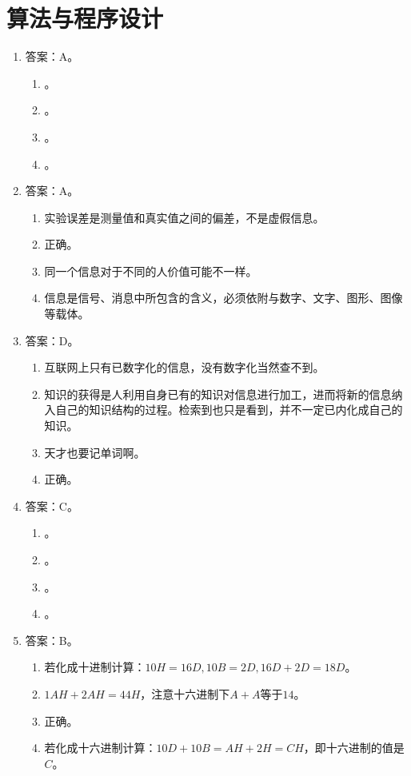 \section{算法与程序设计}

\begin{enumerate}
\item 答案：A。
	\begin{enumerate}[label=\Alph*.]
	\item 。
	\item 。
	\item 。
	\item 。
	\end{enumerate}

\item 答案：A。
	\begin{enumerate}[label=\Alph*.]
	\item 实验误差是测量值和真实值之间的偏差，不是虚假信息。
	\item 正确。
	\item 同一个信息对于不同的人价值可能不一样。
	\item 信息是信号、消息中所包含的含义，必须依附与数字、文字、图形、图像等载体。
	\end{enumerate}

\item 答案：D。
	\begin{enumerate}[label=\Alph*.]
	\item 互联网上只有已数字化的信息，没有数字化当然查不到。
	\item 知识的获得是人利用自身已有的知识对信息进行加工，进而将新的信息纳入自己的知识结构的过程。检索到也只是看到，并不一定已内化成自己的知识。
	\item 天才也要记单词啊。
	\item 正确。
	\end{enumerate}

\item 答案：C。
	\begin{enumerate}[label=\Alph*.]
	\item 。
	\item 。
	\item 。
	\item 。
	\end{enumerate}

\item 答案：B。
	\begin{enumerate}[label=\Alph*.]
	\item 若化成十进制计算：$10H=16D, 10B = 2D, 16D+2D=18D$。
	\item $1AH + 2AH = 44H$，注意十六进制下$A + A$等于$14$。
	\item 正确。
	\item 若化成十六进制计算：$10D + 10B = AH + 2H = CH$，即十六进制的值是$C$。
	\end{enumerate}


\end{enumerate}
